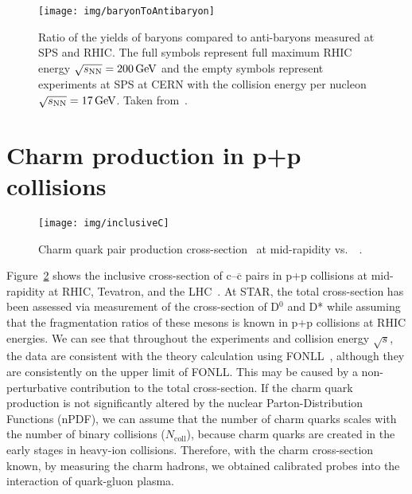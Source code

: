 \begin{figure}
\centering
\texttt{[image: img/baryonToAntibaryon]}
\caption[Ratio of the yields of baryons compared to anti-baryons measured at SPS and~RHIC\@.]{\label{fig:BtoAntiB}Ratio of the yields of baryons compared to anti-baryons measured at SPS and RHIC\@. The full symbols represent full maximum RHIC energy $\sqrt{s_\text{NN}} = \SI{200}{GeV}$ and the empty symbols represent experiments at SPS at CERN with the collision energy per nucleon $\sqrt{s_\text{NN}} = \SI{17}{GeV}$. Taken from~\cite{BtoAntiB}.}

\end{figure}

\section{Charm production in p+p collisions}

\begin{figure}[!htb]
\centering
\texttt{[image: img/inclusiveC]}
\caption[Charm quark pair production cross-section at mid-rapidity vs.\ \pt.]{Charm quark pair production cross-section~\cite{pp500GeVcharm} at mid-rapidity vs.\ \pt~\cite{FONLLcharm,GuannanQM15,ALICEcharm,CDFcharm,inclusiveC}.}
\label{fig:inclusiveC}
\end{figure}

Figure~\ref{fig:inclusiveC} shows the inclusive cross-section of c--$\overline{\mathrm{c}}$ pairs in p+p collisions at mid-rapidity at RHIC, Tevatron, and the LHC~\cite{GuannanQM15,ALICEcharm,CDFcharm,inclusiveC,pp500GeVcharm}\@. At STAR, the total cross-section has been assessed via measurement of the cross-section of D$^0$ and D* while assuming that the fragmentation ratios of these mesons is known in p+p collisions at RHIC energies. We can see that throughout the experiments and collision energy $\sqrt{s}$, the data are consistent with the theory calculation using FONLL~\cite{FONLLcharm}, although they are consistently on the upper limit of FONLL\@. This may be caused by a non-perturbative contribution to the total cross-section. If the charm quark production is not significantly altered by the nuclear Parton-Distribution Functions (nPDF), we can assume that the number of charm quarks scales with the number of binary collisions ($N_\mathrm{coll}$), because charm quarks are created in the early stages in heavy-ion collisions. Therefore, with the charm cross-section known, by measuring the charm hadrons, we obtained calibrated probes into the interaction of quark-gluon plasma.

